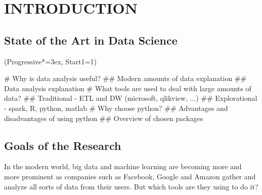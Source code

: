 \documentclass[12pt, a4paper]{article}
\let\OldEasylist\easylist
\let\OldEndEasylist\endeasylist
\renewenvironment{easylist}{%
    \OldEasylist%
    \ListProperties(Progressive*=3ex, Start1=1)%
}{%
    \OldEndEasylist%
}%
\begin{document}

\begin{titlepage}
\end{titlepage}

\newpage


\tableofcontents

\newpage
\newpage
{}


\begin{abstract}

\end{abstract}



\newpage
\section{INTRODUCTION}

\subsection{State of the Art in Data Science}
\begin{easylist}
# Why is data analysis useful?
## Modern amounts of data explanation
## Data analysis explanation
# What tools are used to deal with large amounts of data?
## Traditional - ETL and DW (microsoft, qlikview, ...)
## Explorational - spark, R, python, matlab
# Why choose python?
## Advantages and disadvantages of using python
## Overview of chosen packages
\end{easylist}

\subsection{Goals of the Research}
 In the modern world, big data and machine learning are becoming more and more prominent as companies such as Facebook, Google and Amazon gather and analyze all sorts of data from their users. But which tools are they using to do it?
\end{document}
